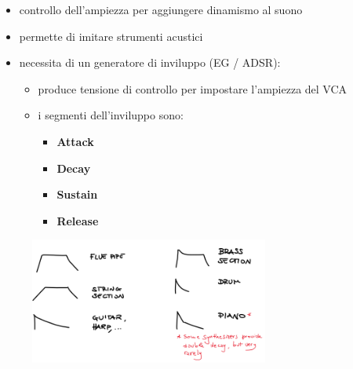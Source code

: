 \begin{itemize}
    \item controllo dell’ampiezza per aggiungere dinamismo al suono
    \item permette di imitare strumenti acustici
    \item necessita di un generatore di inviluppo (EG / ADSR):
    \begin{itemize}
        \item produce tensione di controllo per impostare l’ampiezza del VCA
        \item i segmenti dell’inviluppo sono:
        \begin{itemize}
            \item \textbf{Attack}
            \item \textbf{Decay}
            \item \textbf{Sustain}
            \item \textbf{Release}
        \end{itemize}
    \end{itemize}
\end{itemize}

\begin{figure}[H]
    \centering
    \includegraphics[width=0.7\textwidth]{capitoli/capitolo12/immagini/image5.png}
\end{figure}